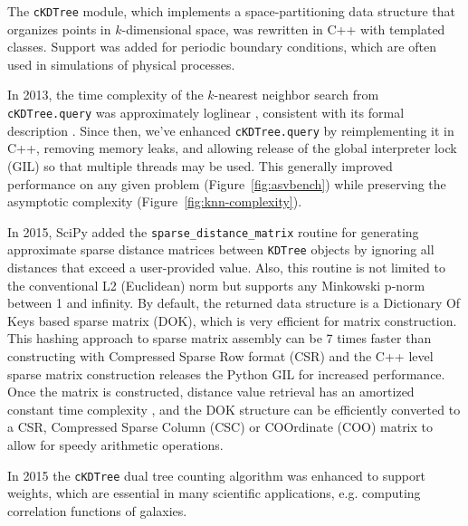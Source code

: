 The \texttt{cKDTree} module, which implements a space-partitioning data structure that
organizes points in $k$-dimensional space, was rewritten in C++ with templated classes. 
Support was added for periodic boundary conditions, which are often used 
in simulations of physical processes. 

In 2013, the time complexity of the $k$-nearest neighbor search from
\texttt{cKDTree.query} was approximately loglinear \cite{knn-jake},
consistent with its formal description \cite{kdtree-search-algo}.
Since then, we've enhanced \texttt{cKDTree.query} by reimplementing it in
C++, removing memory leaks, and allowing release of the global interpreter lock (GIL) so that
multiple threads may be used\cite{gh-4374}. This generally improved
performance on any given problem (Figure~\ref{fig:asvbench}) while
preserving the asymptotic complexity (Figure~\ref{fig:knn-complexity}).

In 2015, SciPy added the \texttt{sparse\_distance\_matrix} routine for generating 
approximate sparse distance matrices between \texttt{KDTree} objects by ignoring 
all distances that exceed a user-provided value. Also, this routine is not 
limited to the conventional L2 (Euclidean) norm but supports any Minkowski 
p-norm between 1 and infinity. By default, the returned data structure is a 
Dictionary Of Keys based sparse matrix (DOK), which is very efficient for matrix 
construction. This hashing approach to sparse matrix assembly can be 7 times 
faster than constructing with Compressed Sparse Row format (CSR) 
\cite{10.1007/978-3-540-75755-9_107} and the C++ level sparse matrix construction 
releases the Python GIL for increased performance. Once the matrix is constructed, 
distance value retrieval has an amortized constant time complexity 
\cite{Cormen:2001:IA:580470}, and the DOK structure can be efficiently converted 
to a CSR, Compressed Sparse Column (CSC) or COOrdinate (COO) matrix to allow for 
speedy arithmetic operations.

In 2015 the \texttt{cKDTree} dual tree counting algorithm\cite{Moore2000ar}
was enhanced to support weights\cite{ckdtree-weights}, which are
essential in many scientific applications, e.g. computing correlation
functions of galaxies\cite{0004-637X-750-1-38}.
